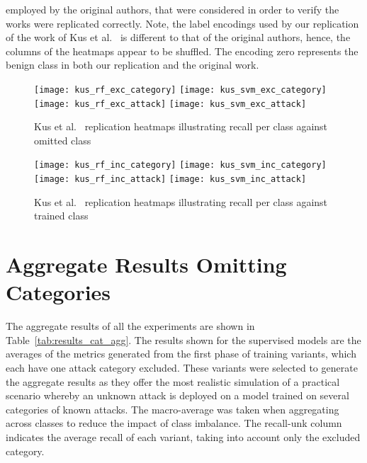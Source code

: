 employed by the original authors, that were considered in order to verify the
works were replicated correctly. Note, the label encodings used by our
replication of the work of Kus et al.~\cite{Kus} is different to that of the
original authors, hence, the columns of the heatmaps appear to be shuffled. The
encoding zero represents the benign class in both our replication and the
original work.
%
\begin{figure}[htbp]
    \centering
    \texttt{[image: kus\_rf\_exc\_category]}
    \texttt{[image: kus\_svm\_exc\_category]}
    \texttt{[image: kus\_rf\_exc\_attack]}
    \texttt{[image: kus\_svm\_exc\_attack]}
    \caption[Kus et al.~\cite{Kus} Replication Class Omission Heatmaps]{Kus et al.~\cite{Kus} replication heatmaps illustrating recall per class against omitted class\label{fig:kus_rep_exc}}
\end{figure}

\begin{figure}[htbp]
    \centering
    \texttt{[image: kus\_rf\_inc\_category]}
    \texttt{[image: kus\_svm\_inc\_category]}
    \texttt{[image: kus\_rf\_inc\_attack]}
    \texttt{[image: kus\_svm\_inc\_attack]}
    \caption[Kus et al.~\cite{Kus} Replication Single Class Heatmaps]{Kus et al.~\cite{Kus} replication heatmaps illustrating recall per class against trained class\label{fig:kus_rep_inc}}
\end{figure}
% 

\section{Aggregate Results Omitting Categories}%
\label{sec:agg_res_cat}


The aggregate results of all the experiments are shown in
Table~\ref{tab:results_cat_agg}. The results shown for the supervised models
are the averages of the metrics generated from the first phase of training
variants, which each have one attack category excluded. These variants were
selected to generate the aggregate results as they offer the most realistic
simulation of a practical scenario whereby an unknown attack is deployed on a
model trained on several categories of known attacks. The macro-average was
taken when aggregating across classes to reduce the impact of class imbalance.
The recall-unk column indicates the average recall of each variant, taking into
account only the excluded category.

